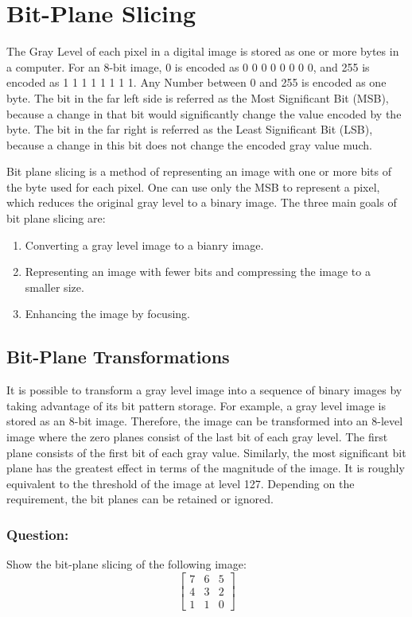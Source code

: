 \section{Bit-Plane Slicing}

The Gray Level of each pixel in a digital image is stored as one or more bytes in a computer.
For an 8-bit image, 0 is encoded as 0 0 0 0 0 0 0 0, and 255 is encoded as 1 1 1 1 1 1 1 1.
Any Number between 0 and 255 is encoded as one byte.
The bit in the far left side is referred as the Most Significant Bit (MSB), because a change in that bit would significantly change the value encoded by the byte.
The bit in the far right is referred as the Least Significant Bit (LSB), because a change in this bit does not change the encoded gray value much.

Bit plane slicing is a method of representing an image with one or more bits of the byte used for each pixel.
One can use only the MSB to represent a pixel, which reduces the original gray level to a binary image.
The three main goals of bit plane slicing are:
\begin{enumerate}
    \item Converting a gray level image to a bianry image.
    \item Representing an image with fewer bits and compressing the image to a smaller size.
    \item Enhancing the image by focusing.
\end{enumerate}

\subsection{Bit-Plane Transformations}

It is possible to transform a gray level image into a sequence of binary images by taking advantage of its bit pattern storage.
For example, a gray level image is stored as an 8-bit image. Therefore, the image can be transformed into an 8-level image where the zero planes consist of the last bit of each gray level.
The first plane consists of the first bit of each gray value.
Similarly, the most significant bit plane has the greatest effect in terms of the magnitude of the image.
It is roughly equivalent to the threshold of the image at level 127.
Depending on the requirement, the bit planes can be retained or ignored.

\subsubsection{Question:}
Show the bit-plane slicing of the following image:
\begin{equation*}
    \begin{bmatrix}
        7 & 6 & 5\\
        4 & 3 & 2\\
        1 & 1 & 0
    \end{bmatrix}
\end{equation*}

